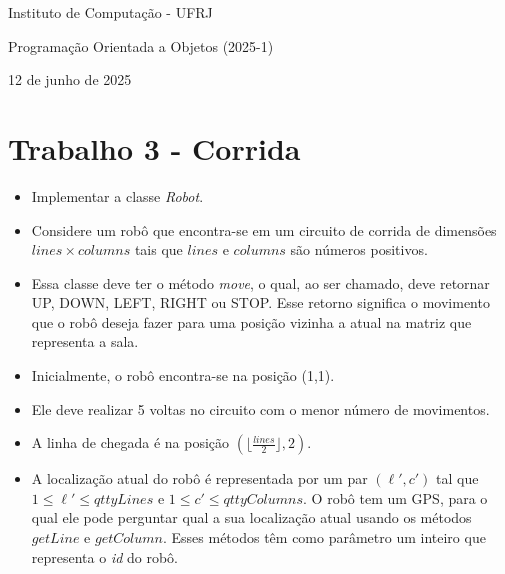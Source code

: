 \documentclass[10pt]{article}
\begin{document}
	
\begin{center}
	\bf{Instituto de Computação - UFRJ
		
		Programação Orientada a Objetos (2025-1)
		
		12 de junho de 2025}
\end{center}
	
\bigskip

\section{Trabalho 3 - Corrida}

\begin{itemize}
	
	\item Implementar a classe {\em Robot}.
	
	\item Considere um robô que encontra-se em um circuito de corrida de dimensões $lines \times columns$ tais que $lines$ e $columns$ são números positivos.
	
	\item Essa classe deve ter o método {\em move}, o qual, ao ser chamado, deve retornar UP, DOWN, LEFT, RIGHT ou STOP. Esse retorno significa o movimento que o robô deseja fazer para uma posição vizinha a atual na matriz que representa a sala.
		
	\item Inicialmente, o robô encontra-se na posição (1,1).
	
	\item Ele deve realizar 5 voltas no circuito com o menor número de movimentos.
	
	\item A linha de chegada é na posição $(\lfloor\frac{lines}{2}\rfloor,2)$.
	
	\item A localização atual do robô é representada por um par $(\ell', c')$ tal que $1 \le \ell' \le qttyLines$ e $1 \le c' \le qttyColumns$. O robô tem um GPS, para o qual ele pode perguntar qual a sua locali\-zação atual usando os métodos $getLine$ e $getColumn$. Esses métodos têm como parâmetro um inteiro que representa o {\em id} do robô.
	
\end{itemize}
\end{document}
